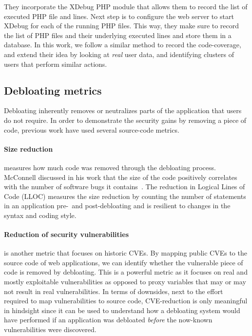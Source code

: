 %
They incorporate the XDebug PHP module that allows them to record the list of executed PHP file and lines. 
Next step is to configure the web server to start XDebug for each of the running PHP files. 
This way, they make sure to record the list of PHP files and their underlying executed lines and store them in a database. 
In this work, we follow a similar method to record the code-coverage, and extend their idea by looking at \emph{real} user data, and identifying clusters of users that perform similar actions. 

\subsection{Debloating metrics}

Debloating inherently removes or neutralizes parts of the application that users do not require. 
In order to demonstrate the security gains by removing a piece of code, previous work have used several source-code metrics. 

\paragraph{Size reduction} measures how much code was removed through the debloating process. 
McConnell discussed in his work that the size of the code positively correlates with the number of software bugs it contains~\cite{mcconnell2004code}. The reduction in Logical Lines of Code (LLOC) measures the size reduction by counting the number of statements in an application pre-~and post-debloating and is resilient to changes in the syntax and coding style.

\paragraph{Reduction of security vulnerabilities} is another metric that focuses on historic CVEs. 
By mapping public CVEs to the source code of web applications, we can identify whether the vulnerable piece of code is removed by debloating. 
This is a powerful metric as it focuses on real and mostly exploitable vulnerabilities as opposed to proxy variables that may or may not result in real vulnerabilities. In terms of downsides, next to the effort required to map vulnerabilities to source code, CVE-reduction is only meaningful in hindsight since it can be used to understand how a debloating system would have performed if an application was debloated \emph{before} the now-known vulnerabilities were discovered. 


